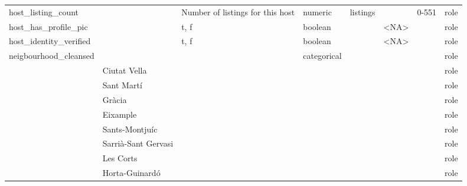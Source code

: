 \begin{center}
\begin{xltabular}{\textwidth}{llXlllll}
host\_listing\_count        &                             & Number of listings for this host & numeric     & listings       &                             &                     0-551   & role \\
host\_has\_profile\_pic     &                             & t, f & boolean     &                & \textless{}NA\textgreater{} &                     & role \\
host\_identity\_verified    &                             & t, f & boolean     &                & \textless{}NA\textgreater{} &                     & role \\
neigbourhood\_cleansed      &                             &                                   & categorical &                &                             &                     & role \\
                            & Ciutat Vella                &                                   &             &                &                             &                     & role \\
                            & Sant Martí                  &                                   &             &                &                             &                     & role \\
                            & Gràcia                      &                                   &             &                &                             &                     & role \\
                            & Eixample                    &                                   &             &                &                             &                     & role \\
                            & Sants-Montjuíc              &                                   &             &                &                             &                     & role \\
                            & Sarrià-Sant Gervasi         &                                   &             &                &                             &                     & role \\
                            & Les Corts                   &                                   &             &                &                             &                     & role \\
                            & Horta-Guinardó              &                                   &             &                &                             &                     & role \\

\end{xltabular}
\end{center}
